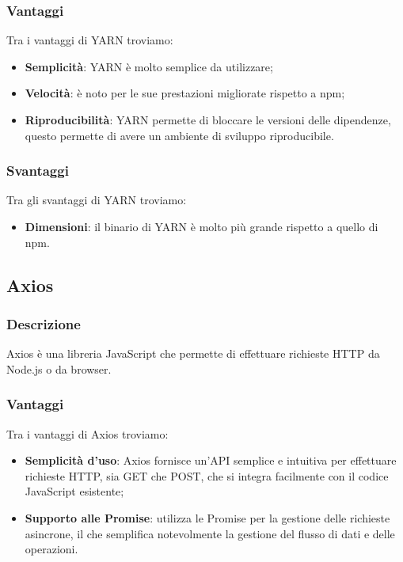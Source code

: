 \subsubsection*{Vantaggi}
Tra i vantaggi di YARN troviamo:
\begin{itemize}
    \item \textbf{Semplicità}: YARN è molto semplice da utilizzare;
    \item \textbf{Velocità}: è noto per le sue prestazioni migliorate rispetto a npm;
    \item \textbf{Riproducibilità}: YARN permette di bloccare le versioni delle dipendenze, questo permette di avere un ambiente di sviluppo riproducibile.
\end{itemize}

\subsubsection*{Svantaggi}
Tra gli svantaggi di YARN troviamo:
\begin{itemize}
    \item \textbf{Dimensioni}: il binario di YARN è molto più grande rispetto a quello di npm.
\end{itemize}


\subsection*{Axios}

\subsubsection*{Descrizione}
Axios è una libreria JavaScript che permette di effettuare richieste HTTP da Node.js o da browser.

\subsubsection*{Vantaggi}
Tra i vantaggi di Axios troviamo:
\begin{itemize}
    \item \textbf{Semplicità d'uso}: Axios fornisce un'API semplice e intuitiva per effettuare richieste HTTP, sia GET che POST, che si integra facilmente con il codice JavaScript esistente;
    \item \textbf{Supporto alle Promise}: utilizza le Promise per la gestione delle richieste asincrone, il che semplifica notevolmente la gestione del flusso di dati e delle operazioni.
\end{itemize}

